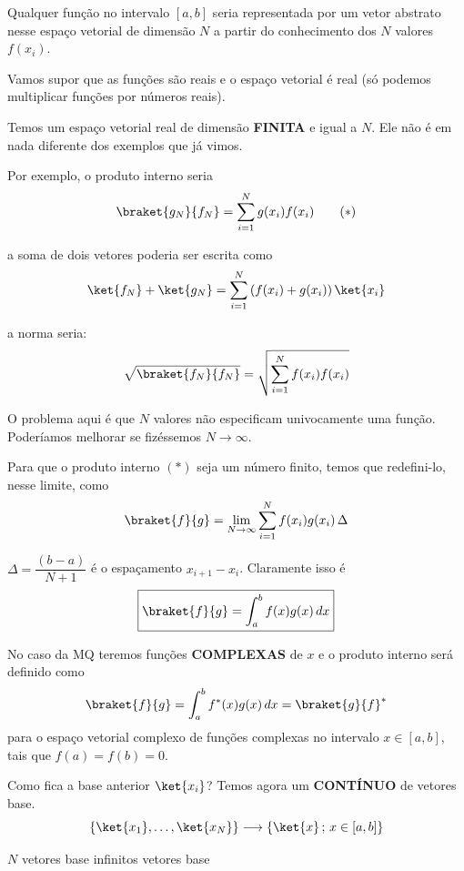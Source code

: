 Qualquer função no intervalo $[a,b]$ seria representada por um vetor abstrato nesse espaço vetorial de dimensão $N$ a partir do conhecimento dos $N$ valores $f(x_i)$.

Vamos supor que as funções são reais e o espaço vetorial é real (só podemos multiplicar funções por números reais).

Temos um espaço vetorial real de dimensão \textbf{FINITA} e igual a $N$. Ele não é em nada diferente dos exemplos que já vimos.

Por exemplo, o produto interno seria
\begin{equation}
    \braket{g_N}{f_N} = \sum_{i=1}^N g(x_i) f(x_i) \tag{$*$}
\end{equation}

a soma de dois vetores poderia ser escrita como
\begin{equation}
    \ket{f_N} + \ket{g_N} = \sum_{i=1}^N \left(f(x_i) + g(x_i)\right)\ket{x_i}
\end{equation}

a norma seria:
\begin{equation}
    \sqrt{\braket{f_N}{f_N}} = \sqrt{\sum_{i=1}^N f(x_i)f(x_i)}
\end{equation}

O problema aqui é que $N$ valores não especificam univocamente uma função. Poderíamos melhorar se fizéssemos $N \to \infty$.

Para que o produto interno $(*)$ seja um número finito, temos que redefini-lo, nesse limite, como
\begin{equation}
    \braket{f}{g} = \lim_{N \to \infty} \sum_{i=1}^N f(x_i) g(x_i)\, \Delta
\end{equation}

$\Delta = \dfrac{(b-a)}{N+1}$ é o espaçamento $x_{i+1} - x_i$. Claramente isso é
\begin{equation}
    \boxed{\braket{f}{g} = \int_a^b f(x) g(x)\, dx}
\end{equation}

No caso da MQ teremos funções \textbf{COMPLEXAS} de $x$ e o produto interno será definido como
\begin{equation}
    \braket{f}{g} = \int_a^b f^*(x) g(x)\, dx = \braket{g}{f}^*
\end{equation}
para o espaço vetorial complexo de funções complexas no intervalo $x \in [a,b]$, tais que $f(a) = f(b) = 0$.

Como fica a base anterior $\ket{x_i}$? Temos agora um \textbf{CONTÍNUO} de vetores base.
\begin{equation}
    \{\ket{x_1}, \dots, \ket{x_N}\} \longrightarrow \{\ket{x}\, ; \, x \in [a,b]\}
\end{equation}
\begin{center}
    $N$ vetores base \hspace{3cm} infinitos vetores base
\end{center}

